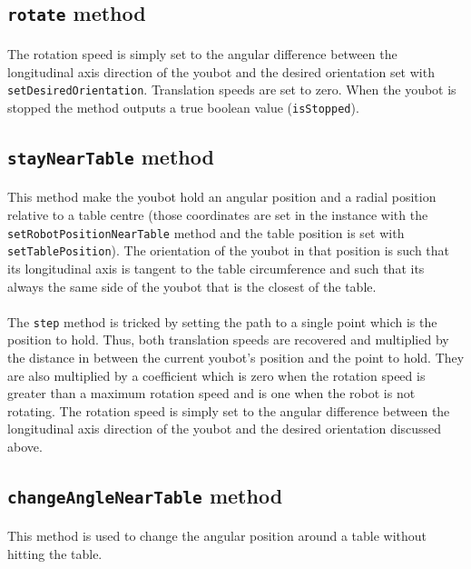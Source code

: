 \documentclass[12pt,a4paper]{article}
\begin{document}
\subsection{\texttt{rotate} method}
\paragraph{} The rotation speed is simply set to the angular difference between the longitudinal axis direction of the youbot and the desired orientation set with \texttt{setDesiredOrientation}. Translation speeds are set to zero. When the youbot is stopped the method outputs a true boolean value (\texttt{isStopped}).


\subsection{\texttt{stayNearTable} method}
\paragraph{} This method make the youbot hold an angular position and a radial position relative to a table centre (those coordinates are set in the instance with the \texttt{setRobotPositionNearTable} method and the table position is set with \texttt{setTablePosition}). The orientation of the youbot in that position is such that its longitudinal axis is tangent to the table circumference and such that its always the same side of the youbot that is the closest of the table.

\paragraph{} The \texttt{step} method is tricked by setting the path to a single point which is the position to hold. Thus, both translation speeds are recovered and multiplied by the distance in between the current youbot's position and the point to hold. They are also multiplied by a coefficient which is zero when the rotation speed is greater than a maximum rotation speed and is one when the robot is not rotating. The rotation speed is simply set to the angular difference between the longitudinal axis direction of the youbot and the desired orientation discussed above.

\subsection{\texttt{changeAngleNearTable} method}
\paragraph{} This method is used to change the angular position around a table without hitting the table.
\end{document}
